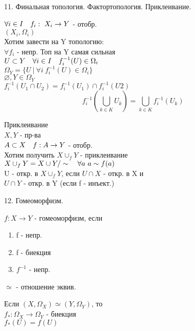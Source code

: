 \documentclass[11pt, fleqn]{article}
\begin{document}
    \begin{question}{11. Финальная топология. Фактортопология. Приклеивание.}
        \begin{definition}
            $\forall i \in I \quad f_i: \ X_i \rightarrow Y$ - отобр.\\
            $(X_i, \Omega_i)$\\
            Хотим завести на Y топологию:\\
            $\forall f_i$ - непр. Топ на Y самая сильная \\
            $U \subset Y \quad \forall i \in I \quad f_i^{-1}(U) \in \Omega_i$\\
            $\Omega_Y = \{U \ | \ \forall i \ f_i^{-1}(U) \in \Omega_i\}$\\
            $\varnothing, Y \in \Omega_Y$\\
            $f_i^{-1}(U_1 \cap U_2) = f_i^{-1}(U_1) \cap f_i^{-1}(U2)$\\
            \[f_i^{-1}(\bigcup_{k \in K} U_k) = \bigcup_{k \in K} f_i^{-1}(U_k)\]
        \end{definition}

        \begin{example}
            Приклеивание\\
            $X, Y$ - пр-ва\\
            $A \subset X \quad f: A \rightarrow Y$ - отобр.\\
            Хотим получить $X \cup_f Y$ - приклеивание\\
            $X \cup_f Y = X \cup Y /\sim \quad \forall a \ a \sim f(a)$\\
            U - откр. в $X \cup_f Y$, если $U \cap X$ - откр. в X и\\ $U \cap Y$ - откр. в Y
            (если f - инъект.)
        \end{example}
    \end{question}

    \begin{question}{12. Гомеоморфизм.}
        \begin{definition}
            $f: X \rightarrow Y$ - гомеоморфизм, если\\
            \begin{enumerate}
                \item f - непр.
                \item f - биекция
                \item $f^{-1}$ - непр.
            \end{enumerate}
        \end{definition}

        \begin{hypothesis}
            $\simeq$ - отношение эквив.
        \end{hypothesis}

        \begin{theorem}
            Если $(X, \Omega_X) \simeq (Y, \Omega_Y)$, то\\
            $f_*: \Omega_X \rightarrow \Omega_Y$ - биекция\\
            $f_*(U) = f(U)$
        \end{theorem}
    \end{question}
\end{document}
